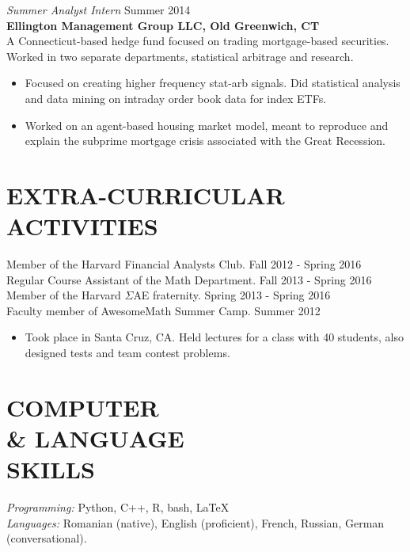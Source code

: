 \documentclass[margin]{res}
\begin{document}
\begin{resume}
  {\sl Summer Analyst Intern} \hfill Summer 2014 \\
  \textbf{Ellington Management Group LLC, Old Greenwich, CT} \\
  A Connecticut-based hedge fund focused on trading mortgage-based securities.
  Worked in two separate departments, statistical arbitrage and research.
  \begin{itemize} \itemsep -2pt
    \item Focused on creating higher frequency stat-arb signals.
      Did statistical analysis and data mining on intraday order book data for index ETFs.
    \item Worked on an agent-based housing market model, meant to reproduce and explain the
      subprime mortgage crisis associated with the Great Recession.
  \end{itemize}

  \section{EXTRA-CURRICULAR \\ ACTIVITIES} Member of the Harvard Financial Analysts Club.
    \hfill Fall 2012 - Spring 2016 \\
  Regular Course Assistant of the Math Department. \hfill Fall 2013 - Spring 2016 \\
  Member of the Harvard $\Sigma$AE fraternity. \hfill Spring 2013 - Spring 2016 \\
  Faculty member of AwesomeMath Summer Camp. \hfill Summer 2012
  \begin{itemize} \itemsep -2pt
    \item Took place in Santa Cruz, CA. Held lectures for a class with 40 students,
      also designed tests and team contest problems. \\
  \end{itemize}

  \section{COMPUTER \\ \& LANGUAGE \\ SKILLS} {\sl Programming:\/} Python, C++, R, bash, \LaTeX  \\
  {\sl Languages:\/} Romanian (native), English (proficient), French, Russian, German (conversational).

\end{resume}
\end{document}
